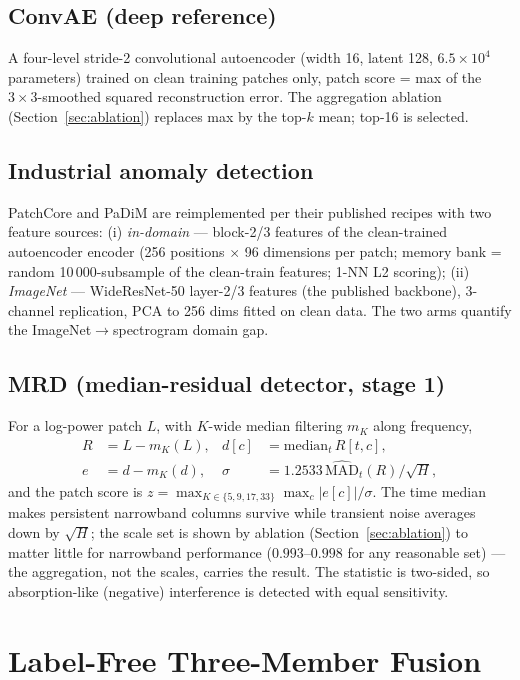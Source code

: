 \documentclass[journal]{IEEEtran}
\begin{document}
\subsection{ConvAE (deep reference)}
A four-level stride-2 convolutional autoencoder (width 16, latent 128,
$6.5\times10^4$ parameters) trained on clean training patches only,
patch score = max of the $3\times3$-smoothed squared reconstruction error.
The aggregation ablation (Section~\ref{sec:ablation}) replaces max by the
top-$k$ mean; top-16 is selected.

\subsection{Industrial anomaly detection}
PatchCore \cite{roth2022} and PaDiM \cite{defard2021} are reimplemented per
their published recipes with two feature sources: (i) \emph{in-domain} ---
block-2/3 features of the clean-trained autoencoder encoder (256 positions
$\times$ 96 dimensions per patch; memory bank = random 10\,000-subsample of
the clean-train features; 1-NN L2 scoring); (ii) \emph{ImageNet} ---
WideResNet-50 layer-2/3 features (the published backbone), 3-channel
replication, PCA to 256 dims fitted on clean data.  The two arms quantify
the ImageNet$\to$spectrogram domain gap.

\subsection{MRD (median-residual detector, stage 1)}
For a log-power patch $L$, with $K$-wide median filtering $m_K$ along
frequency,
\begin{align}
R &= L - m_K(L), &
d[c] &= \mathrm{median}_t\, R[t,c], \\
e &= d - m_K(d), &
\sigma &= 1.2533\,\widehat{\mathrm{MAD}}_t(R)/\sqrt{H},
\end{align}
and the patch score is $z=\max_{K\in\{5,9,17,33\}}\max_c |e[c]|/\sigma$.
The time median makes persistent narrowband columns survive while transient
noise averages down by $\sqrt{H}$; the scale set is shown by ablation
(Section~\ref{sec:ablation}) to matter little for narrowband performance
($0.993$--$0.998$ for any reasonable set) --- the aggregation, not the
scales, carries the result.  The statistic is two-sided, so absorption-like
(negative) interference is detected with equal sensitivity.

\section{Label-Free Three-Member Fusion}
\label{sec:fusion}
\end{document}
